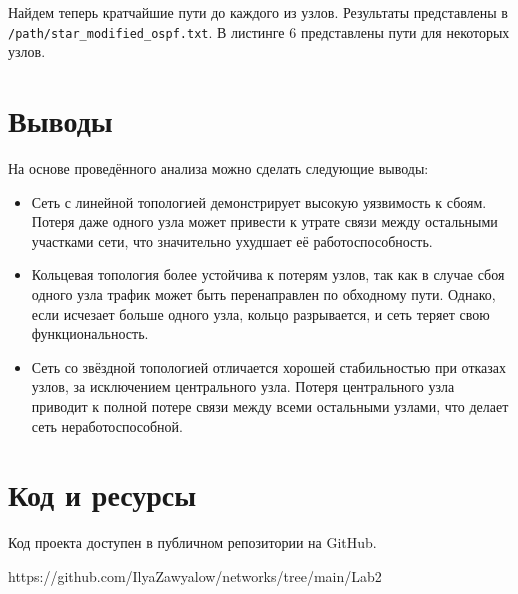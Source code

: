 \documentclass[a4paper,14pt]{extarticle}
\begin{document}
Найдем теперь кратчайшие пути до каждого из узлов. Результаты представлены в \texttt{/path/star\_modified\_ospf.txt}. В листинге 6 представлены пути для некоторых узлов.



\section{Выводы}

На основе проведённого анализа можно сделать следующие выводы:

\begin{itemize}
    \item Сеть с линейной топологией демонстрирует высокую уязвимость к сбоям. Потеря даже одного узла может привести к утрате связи между остальными участками сети, что значительно ухудшает её работоспособность.
    \item Кольцевая топология более устойчива к потерям узлов, так как в случае сбоя одного узла трафик может быть перенаправлен по обходному пути. Однако, если исчезает больше одного узла, кольцо разрывается, и сеть теряет свою функциональность.
    \item Сеть со звёздной топологией отличается хорошей стабильностью при отказах узлов, за исключением центрального узла. Потеря центрального узла приводит к полной потере связи между всеми остальными узлами, что делает сеть неработоспособной.
\end{itemize}

\section{Код и ресурсы}
Код проекта доступен в публичном репозитории на GitHub.

https://github.com/IlyaZawyalow/networks/tree/main/Lab2
\end{document}

